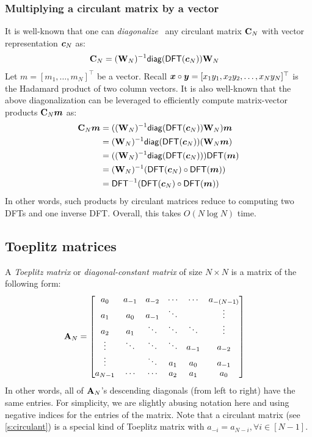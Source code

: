 \subsubsection{Multiplying a circulant matrix by a vector}
\label{s:circulant:diag-dft}
\label{s:circulant:multiply-vec}
It is well-known that one can \textit{diagonalize}~\cite{Diag20} any circulant matrix $\mathbf{C}_N$ with vector representation $\bm{c}_N$ as:
\begin{align}
    \mathbf{C}_N
     &= (\mathbf{W}_N)^{-1} \mathsf{diag}(\mathsf{DFT}(\bm{c}_N)) \mathbf{W}_N
\end{align}
Let $m=[m_1,\dots,m_N]^\top$ be a vector.
Recall $\bm{x}\circ\bm{y} = [x_1 y_1, x_2 y_2,\dots, x_N y_N]^\top$ is the Hadamard product of two column vectors.
It is also well-known that the above diagonalization can be leveraged to efficiently compute matrix-vector products $\mathbf{C}_N\bm{m}$ as:
\begin{align}
    \mathbf{C}_N \bm{m}
        &= ((\mathbf{W}_N)^{-1} \mathsf{diag}(\mathsf{DFT}(\bm{c}_N)) \mathbf{W}_N)\bm{m}\\
        &= (\mathbf{W}_N)^{-1} \mathsf{diag}(\mathsf{DFT}(\bm{c}_N)) (\mathbf{W}_N\bm{m})\\
        &= ((\mathbf{W}_N)^{-1} \mathsf{diag}(\mathsf{DFT}(\bm{c}_N))) \mathsf{DFT}(\bm{m})\\
        &= (\mathbf{W}_N)^{-1} (\mathsf{DFT}(\bm{c}_N)\circ \mathsf{DFT}(\bm{m}))\\
        &= \mathsf{DFT}^{-1}(\mathsf{DFT}(\bm{c}_N)\circ \mathsf{DFT}(\bm{m}))
\end{align}
In other words, such products by circulant matrices reduce to computing two DFTs and one inverse DFT.
Overall, this takes $O(N\log{N})$ time.

\subsection{Toeplitz matrices}
\label{s:toeplitz}

A \textit{Toeplitz matrix} or \textit{diagonal-constant matrix} of size $N\times N$ is a matrix of the following form:
\begin{align}
\mathbf{A}_N&=\begin{bmatrix}
    a_{0}   & a_{-1} & a_{-2} & \cdots & \cdots & a_{-(N-1)}\\
    a_{1}   & a_{0}  & a_{-1} & \ddots &        & \vdots\\
    a_{2}   & a_{1}  & \ddots & \ddots & \ddots & \vdots\\
    \vdots  & \ddots & \ddots & \ddots & a_{-1} & a_{-2}\\
    \vdots  &        & \ddots & a_{1}  & a_{0}  & a_{-1}\\
    a_{N-1} & \cdots & \cdots & a_{2}  & a_{1}  & a_{0}
\end{bmatrix}
\end{align}
In other words, all of $\mathbf{A}_N$'s descending diagonals (from left to right) have the same entries.
For simplicity, we are slightly abusing notation here and using negative indices for the entries of the matrix.
Note that a circulant matrix (see \cref{s:circulant}) is a special kind of Toeplitz matrix with $a_{-i} = a_{N-i},\forall i\in [N - 1]$.


